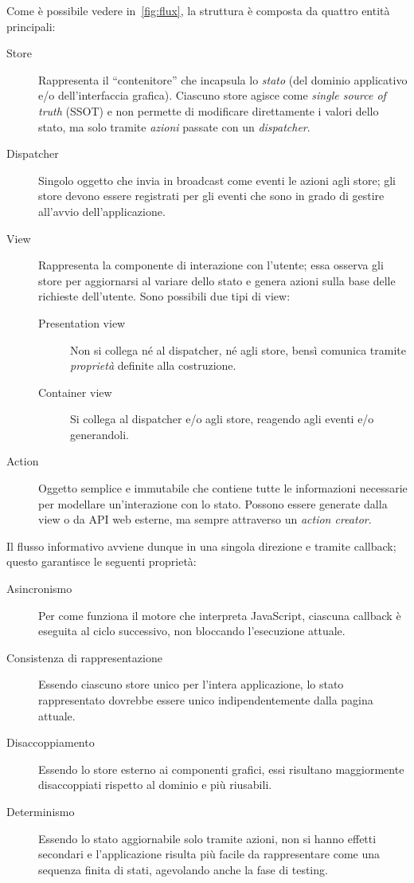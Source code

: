 Come è possibile vedere in~\cref{fig:flux}, la struttura è composta da quattro entità principali:
\begin{description}
  \item[Store]
    Rappresenta il ``contenitore'' che incapsula lo \emph{stato} (del dominio applicativo e/o dell'interfaccia grafica).
    Ciascuno store agisce come \emph{single source of truth} (SSOT)
    e non permette di modificare direttamente i valori dello stato, ma solo tramite \emph{azioni} passate con un \emph{dispatcher}.
  \item[Dispatcher]
    Singolo oggetto che invia in broadcast come eventi le azioni agli store;
    gli store devono essere registrati per gli eventi che sono in grado di gestire all'avvio dell'applicazione.
  \item[View]
    Rappresenta la componente di interazione con l'utente;
    essa osserva gli store per aggiornarsi al variare dello stato e genera azioni sulla base delle richieste dell'utente.
    Sono possibili due tipi di view:
    \begin{description}
      \item[Presentation view] Non si collega né al dispatcher, né agli store, bensì comunica tramite \emph{proprietà} definite alla costruzione.
      \item[Container view] Si collega al dispatcher e/o agli store, reagendo agli eventi e/o generandoli.
    \end{description}
  \item[Action]
    Oggetto semplice e immutabile che contiene tutte le informazioni necessarie per modellare un'interazione con lo stato.
    Possono essere generate dalla view o da API web esterne, ma sempre attraverso un \emph{action creator}.
\end{description}

Il flusso informativo avviene dunque in una singola direzione e tramite callback;
questo garantisce le seguenti proprietà:

\begin{description}
  \item[Asincronismo]
    Per come funziona il motore che interpreta JavaScript, ciascuna callback è eseguita al ciclo successivo, non bloccando l'esecuzione attuale.
  \item[Consistenza di rappresentazione]
    Essendo ciascuno store unico per l'intera applicazione, lo stato rappresentato dovrebbe essere unico indipendentemente dalla pagina attuale.
  \item[Disaccoppiamento]
    Essendo lo store esterno ai componenti grafici, essi risultano maggiormente disaccoppiati rispetto al dominio e più riusabili.
  \item[Determinismo]
    Essendo lo stato aggiornabile solo tramite azioni, non si hanno effetti secondari e l'applicazione risulta più facile da rappresentare come una sequenza finita di stati, agevolando anche la fase di testing.
\end{description}

